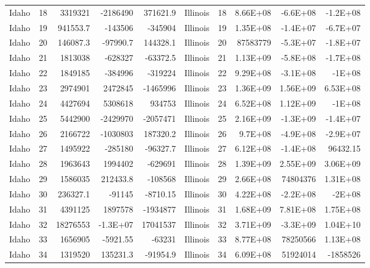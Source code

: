 \begin{table}[]
\begin{tabular}{lrrrrlrrrr}
		Idaho &  18 & 3319321 & -2186490 & 371621.9 & Illinois &  18 & 8.66E+08 & -6.6E+08 & -1.2E+08 \\
		Idaho &  19 & 941553.7 & -143506 & -345904 & Illinois &  19 & 1.35E+08 & -1.4E+07 & -6.7E+07 \\
		Idaho &  20 & 146087.3 & -97990.7 & 144328.1 & Illinois &  20 & 87583779 & -5.3E+07 & -1.8E+07 \\
		Idaho &  21 & 1813038 & -628327 & -63372.5 & Illinois &  21 & 1.13E+09 & -5.8E+08 & -1.7E+08 \\
		Idaho &  22 & 1849185 & -384996 & -319224 & Illinois &  22 & 9.29E+08 & -3.1E+08 & -1E+08 \\
		Idaho &  23 & 2974901 & 2472845 & -1465996 & Illinois &  23 & 1.36E+09 & 1.56E+09 & 6.53E+08 \\
		Idaho &  24 & 4427694 & 5308618 & 934753 & Illinois &  24 & 6.52E+08 & 1.12E+09 & -1E+08 \\
		Idaho &  25 & 5442900 & -2429970 & -2057471 & Illinois &  25 & 2.16E+09 & -1.3E+09 & -1.4E+07 \\
		Idaho &  26 & 2166722 & -1030803 & 187320.2 & Illinois &  26 & 9.7E+08 & -4.9E+08 & -2.9E+07 \\
		Idaho &  27 & 1495922 & -285180 & -96327.7 & Illinois &  27 & 6.12E+08 & -1.4E+08 & 96432.15 \\
		Idaho &  28 & 1963643 & 1994402 & -629691 & Illinois &  28 & 1.39E+09 & 2.55E+09 & 3.06E+09 \\
		Idaho &  29 & 1586035 & 212433.8 & -108568 & Illinois &  29 & 2.66E+08 & 74804376 & 1.31E+08 \\
		Idaho &  30 & 236327.1 & -91145 & -8710.15 & Illinois &  30 & 4.22E+08 & -2.2E+08 & -2E+08 \\
		Idaho &  31 & 4391125 & 1897578 & -1934877 & Illinois &  31 & 1.68E+09 & 7.81E+08 & 1.75E+08 \\
		Idaho &  32 & 18276553 & -1.3E+07 & 17041537 & Illinois &  32 & 3.71E+09 & -3.3E+09 & 1.04E+10 \\
		Idaho &  33 & 1656905 & -5921.55 & -63231 & Illinois &  33 & 8.77E+08 & 78250566 & 1.13E+08 \\
		Idaho &  34 & 1319520 & 135231.3 & -91954.9 & Illinois &  34 & 6.09E+08 & 51924014 & -1858526
	\end{tabular}
\end{table}

